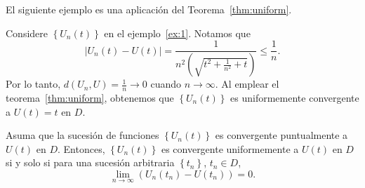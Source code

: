 El siguiente ejemplo es una aplicación del Teorema~\ref{thm:uniform}.
\begin{example}
	Considere $\left\{U_{n}\left(t\right)\right\}$ en el ejemplo~\ref{ex:1}. Notamos que \[ \left|U_{n}\left(t\right)-U\left(t\right)\right|=\frac{1}{n^{2}\left(\sqrt{t^{2}+\frac{1}{n^{2}}+t}\right)}\leq\frac{1}{n}. \] Por lo tanto, $d\left(U_{n},U\right)=\frac{1}{n}\to0$ cuando $n\to\infty$.
	Al emplear el teorema~\ref{thm:uniform}, obtenemos que $\left\{U_{n}\left(t\right)\right\}$ es uniformemente convergente a $U\left(t\right)=t$ en $D$.
\end{example}
\begin{theorem}\label{thm:2}
	Asuma que la sucesión de funciones $\left\{U_{n}\left(t\right)\right\}$ es convergente puntualmente a $U\left(t\right)$ en $D$. Entonces, $\left\{U_{n}\left(t\right)\right\}$ es convergente uniformemente a $U\left(t\right)$ en $D$ si y solo si para una sucesión arbitraria $\left\{t_{n}\right\}$, $t_{n}\in D$, \[ \lim_{n\to\infty}\left(U_{n}\left(t_{n}\right)-U\left(t_{n}\right)\right)=0. \]
\end{theorem}
